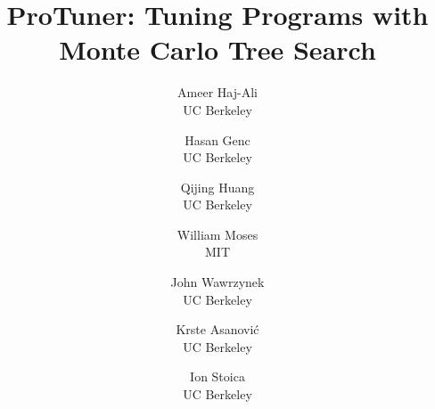 
\usepackage{graphicx}
\usepackage{subcaption}
\newcommand{\wmnote}[1]{{\color{blue} Billy: #1}}
\newcommand{\ameer}[1]{{\color{red} Ameer: #1}}
\newcommand{\jenny}[1]{{\color{green} [Jenny: #1]}}




\title{\Large \bf ProTuner: Tuning Programs with Monte Carlo Tree Search}
\author{
 {\rm Ameer Haj-Ali}\\
  UC Berkeley
  \and
  {\rm Hasan Genc}\\
  UC Berkeley
  \and
   {\rm Qijing Huang}\\
 UC Berkeley
 \and
  {\rm William Moses}\\
 MIT
 \and
  {\rm John Wawrzynek}\\
 UC Berkeley
 \and
  {\rm Krste Asanović}\\
 UC Berkeley
 \and
  {\rm Ion Stoica}\\
 UC Berkeley} %

    \maketitle







%










\clearpage




